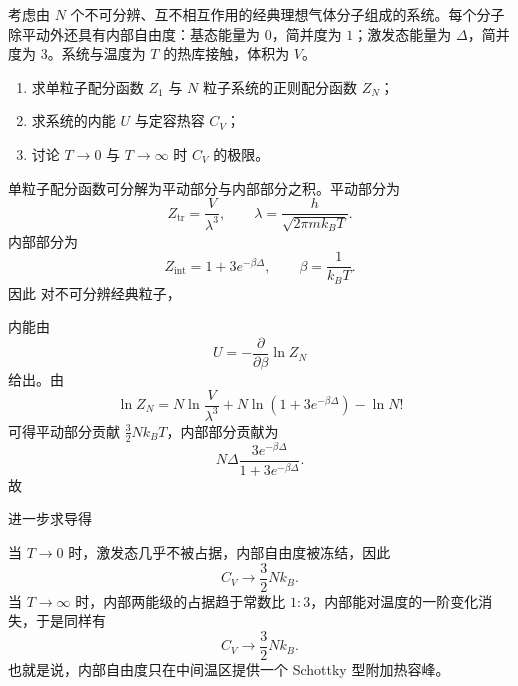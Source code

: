 ﻿

\begin{question}
考虑由 $N$ 个不可分辨、互不相互作用的经典理想气体分子组成的系统。每个分子除平动外还具有内部自由度：基态能量为 $0$，简并度为 $1$；激发态能量为 $\Delta$，简并度为 $3$。系统与温度为 $T$ 的热库接触，体积为 $V$。

\begin{enumerate}[label=(\arabic*),leftmargin=2.5em]
  \item 求单粒子配分函数 $Z_1$ 与 $N$ 粒子系统的正则配分函数 $Z_N$；
  \item 求系统的内能 $U$ 与定容热容 $C_V$；
  \item 讨论 $T\to 0$ 与 $T\to \infty$ 时 $C_V$ 的极限。
\end{enumerate}

\begin{solution}
单粒子配分函数可分解为平动部分与内部部分之积。平动部分为
\[
Z_{\mathrm{tr}}=\frac{V}{\lambda^3},
\qquad
\lambda=\frac{h}{\sqrt{2\pi m k_B T}}.
\]
内部部分为
\[
Z_{\mathrm{int}}=1+3e^{-\beta\Delta},
\qquad \beta=\frac{1}{k_B T}.
\]
因此
对不可分辨经典粒子，

内能由
\[
U=-\frac{\partial}{\partial\beta}\ln Z_N
\]
给出。由
\[
\ln Z_N=N\ln\frac{V}{\lambda^3}+N\ln(1+3e^{-\beta\Delta})-\ln N!
\]
可得平动部分贡献 $\tfrac32 Nk_B T$，内部部分贡献为
\[
N\Delta\frac{3e^{-\beta\Delta}}{1+3e^{-\beta\Delta}}.
\]
故

进一步求导得

当 $T\to 0$ 时，激发态几乎不被占据，内部自由度被冻结，因此
\[
C_V\to \frac32 Nk_B.
\]
当 $T\to \infty$ 时，内部两能级的占据趋于常数比 $1:3$，内部能对温度的一阶变化消失，于是同样有
\[
C_V\to \frac32 Nk_B.
\]
也就是说，内部自由度只在中间温区提供一个 Schottky 型附加热容峰。
\end{solution}
\end{question}

